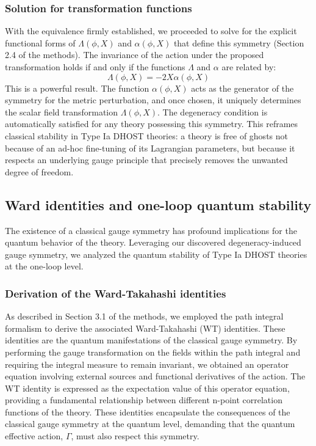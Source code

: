 \documentclass[twocolumn]{aastex631}
\begin{document}
\subsubsection{Solution for transformation functions}
With the equivalence firmly established, we proceeded to solve for the explicit functional forms of $\Lambda(\phi, X)$ and $\alpha(\phi, X)$ that define this symmetry (Section 2.4 of the methods). The invariance of the action under the proposed transformation holds if and only if the functions $\Lambda$ and $\alpha$ are related by:
\begin{equation} \label{eq:lambda_alpha_relation}
    \Lambda(\phi, X) = -2X\alpha(\phi, X)
\end{equation}
This is a powerful result. The function $\alpha(\phi, X)$ acts as the generator of the symmetry for the metric perturbation, and once chosen, it uniquely determines the scalar field transformation $\Lambda(\phi, X)$. The degeneracy condition is automatically satisfied for any theory possessing this symmetry. This reframes classical stability in Type Ia DHOST theories: a theory is free of ghosts not because of an ad-hoc fine-tuning of its Lagrangian parameters, but because it respects an underlying gauge principle that precisely removes the unwanted degree of freedom.

\subsection{Ward identities and one-loop quantum stability}
The existence of a classical gauge symmetry has profound implications for the quantum behavior of the theory. Leveraging our discovered degeneracy-induced gauge symmetry, we analyzed the quantum stability of Type Ia DHOST theories at the one-loop level.

\subsubsection{Derivation of the Ward-Takahashi identities}
As described in Section 3.1 of the methods, we employed the path integral formalism to derive the associated Ward-Takahashi (WT) identities. These identities are the quantum manifestations of the classical gauge symmetry. By performing the gauge transformation on the fields within the path integral and requiring the integral measure to remain invariant, we obtained an operator equation involving external sources and functional derivatives of the action. The WT identity is expressed as the expectation value of this operator equation, providing a fundamental relationship between different n-point correlation functions of the theory. These identities encapsulate the consequences of the classical gauge symmetry at the quantum level, demanding that the quantum effective action, $\Gamma$, must also respect this symmetry.
\end{document}
